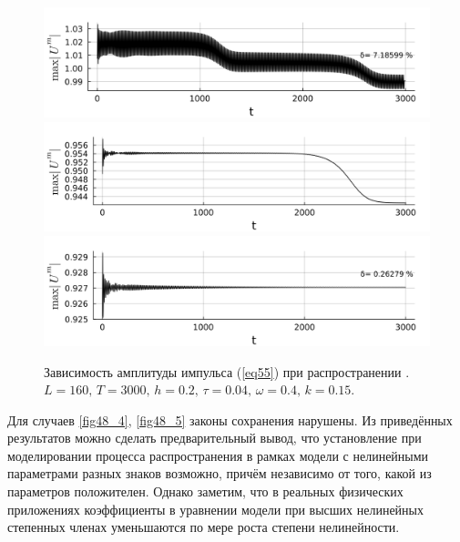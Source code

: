 \documentclass[14pt,a4paper]{extreport}
\begin{document}
			\begin{figure}[H] %
				\begin{minipage}[h]{1\linewidth}
					\includegraphics[width=1\linewidth]{fig37.png}
					\label{fig48_4}
					\includegraphics[width=1\linewidth]{fig71.png}
					\label{fig48_5}
					\includegraphics[width=1\linewidth]{fig83.png}
					\label{fig48_6}
				\end{minipage}
				\caption{Зависимость амплитуды импульса (\ref{eq55}) при распространении .
				\(L=160,\, T=3000,\, h=0.2,\, \tau=0.04,\, \omega=0.4,\, k=0.15\).}
				\label{fig482}
			\end{figure}

			Для случаев \ref{fig48_4}, \ref{fig48_5} законы сохранения нарушены. Из приведённых результатов можно сделать предварительный вывод, что установление при моделировании процесса распространения в рамках модели с нелинейными параметрами разных знаков возможно, причём независимо от того, какой из параметров положителен. Однако заметим, что в реальных физических приложениях коэффициенты в уравнении модели при высших нелинейных степенных членах уменьшаются по мере роста степени нелинейности. 
			
\end{document}
